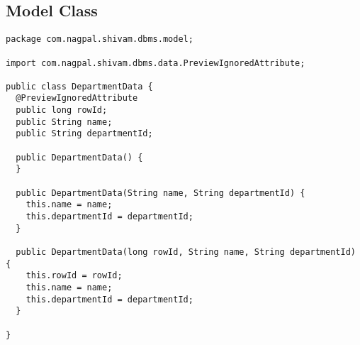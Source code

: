 \pagebreak
\subsection{Model Class}
\thispagestyle{fancy}
\begin{lstlisting}[caption=DepartmentData.java]
package com.nagpal.shivam.dbms.model;

import com.nagpal.shivam.dbms.data.PreviewIgnoredAttribute;

public class DepartmentData {
  @PreviewIgnoredAttribute
  public long rowId;
  public String name;
  public String departmentId;

  public DepartmentData() {
  }

  public DepartmentData(String name, String departmentId) {
    this.name = name;
    this.departmentId = departmentId;
  }

  public DepartmentData(long rowId, String name, String departmentId) {
    this.rowId = rowId;
    this.name = name;
    this.departmentId = departmentId;
  }
  
}
\end{lstlisting}


\pagebreak
